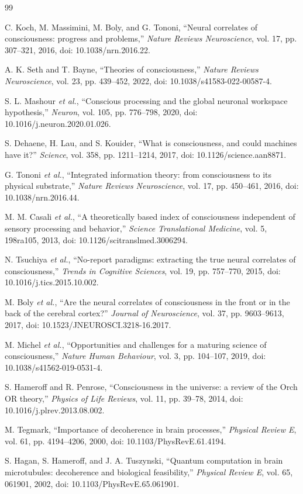 \documentclass[conference]{IEEEtran}
\begin{document}
\begin{thebibliography}{99}

C. Koch, M. Massimini, M. Boly, and G. Tononi, ``Neural correlates of consciousness: progress and problems,'' \emph{Nature Reviews Neuroscience}, vol. 17, pp. 307--321, 2016, doi: 10.1038/nrn.2016.22.

A. K. Seth and T. Bayne, ``Theories of consciousness,'' \emph{Nature Reviews Neuroscience}, vol. 23, pp. 439--452, 2022, doi: 10.1038/s41583-022-00587-4.

S. L. Mashour \textit{et al.}, ``Conscious processing and the global neuronal workspace hypothesis,'' \emph{Neuron}, vol. 105, pp. 776--798, 2020, doi: 10.1016/j.neuron.2020.01.026.

S. Dehaene, H. Lau, and S. Kouider, ``What is consciousness, and could machines have it?'' \emph{Science}, vol. 358, pp. 1211--1214, 2017, doi: 10.1126/science.aan8871.

G. Tononi \textit{et al.}, ``Integrated information theory: from consciousness to its physical substrate,'' \emph{Nature Reviews Neuroscience}, vol. 17, pp. 450--461, 2016, doi: 10.1038/nrn.2016.44.

M. M. Casali \textit{et al.}, ``A theoretically based index of consciousness independent of sensory processing and behavior,'' \emph{Science Translational Medicine}, vol. 5, 198ra105, 2013, doi: 10.1126/scitranslmed.3006294.

N. Tsuchiya \textit{et al.}, ``No-report paradigms: extracting the true neural correlates of consciousness,'' \emph{Trends in Cognitive Sciences}, vol. 19, pp. 757--770, 2015, doi: 10.1016/j.tics.2015.10.002.

M. Boly \textit{et al.}, ``Are the neural correlates of consciousness in the front or in the back of the cerebral cortex?'' \emph{Journal of Neuroscience}, vol. 37, pp. 9603--9613, 2017, doi: 10.1523/JNEUROSCI.3218-16.2017.

M. Michel \textit{et al.}, ``Opportunities and challenges for a maturing science of consciousness,'' \emph{Nature Human Behaviour}, vol. 3, pp. 104--107, 2019, doi: 10.1038/s41562-019-0531-4.

S. Hameroff and R. Penrose, ``Consciousness in the universe: a review of the Orch OR theory,'' \emph{Physics of Life Reviews}, vol. 11, pp. 39--78, 2014, doi: 10.1016/j.plrev.2013.08.002.

M. Tegmark, ``Importance of decoherence in brain processes,'' \emph{Physical Review E}, vol. 61, pp. 4194--4206, 2000, doi: 10.1103/PhysRevE.61.4194.

S. Hagan, S. Hameroff, and J. A. Tuszynski, ``Quantum computation in brain microtubules: decoherence and biological feasibility,'' \emph{Physical Review E}, vol. 65, 061901, 2002, doi: 10.1103/PhysRevE.65.061901.

\end{thebibliography}
\end{document}
